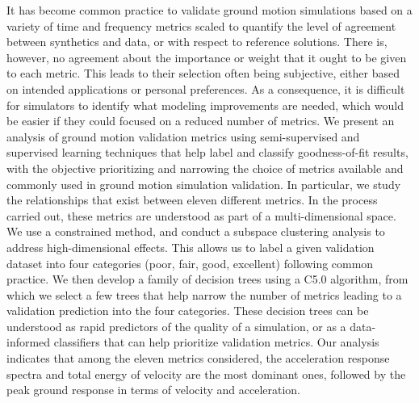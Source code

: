 % 
It has become common practice to validate ground motion simulations based on a variety of time and frequency metrics scaled to quantify the level of agreement between synthetics and data, or with respect to reference solutions. There is, however, no agreement about the importance or weight that it ought to be given to each metric. This leads to their selection often being subjective, either based on intended applications or personal preferences. As a consequence, it is difficult for simulators to identify what modeling improvements are needed, which would be easier if they could focused on a reduced number of metrics. We present an analysis of ground motion validation metrics using semi-supervised and supervised learning techniques that help label and classify goodness-of-fit results, with the objective prioritizing and narrowing the choice of metrics available and commonly used in ground motion simulation validation. In particular, we study the relationships that exist between eleven different metrics. In the process carried out, these metrics are understood as part of a multi-dimensional space. We use a constrained \kmeans{} method, and conduct a subspace clustering analysis to address high-dimensional effects. This allows us to label a given validation dataset into four categories (poor, fair, good, excellent) following common practice. We then develop a family of decision trees using a C5.0 algorithm, from which we select a few trees that help narrow the number of metrics leading to a validation prediction into the four categories. These decision trees can be understood as rapid predictors of the quality of a simulation, or as a data-informed classifiers that can help prioritize validation metrics. Our analysis indicates that among the eleven metrics considered, the acceleration response spectra and total energy of velocity are the most dominant ones, followed by the peak ground response in terms of velocity and acceleration.
